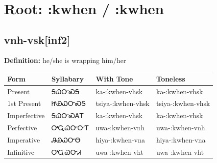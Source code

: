 \documentclass{article}%
\begin{document}
%
\normalsize%
\section*{Root: :kwhen / :kwhen}%
\subsection*{vnh-vsk[inf2]}%
\textbf{Definition: }%
he/she is wrapping him/her%
\\[0.5em]%
\begin{tabular}{|l|l|l|l|}%
\hline%
\textbf{Form}&\textbf{Syllabary}&\textbf{With Tone}&\textbf{Toneless}\\%
\hline%
Present&ᎦᏇᏅᏍᎦ&ka{-}:kwhen{-}vhsk&ka{-}:kwhen{-}vhsk\\%
1st Present&ᏥᏯᏇᏅᏍᎦ&tsiya{-}:kwhen{-}vhsk&tsiya{-}:kwhen{-}vhsk\\%
Imperfective&ᎦᏇᏅᏍᎪᎢ&ka{-}:kwhen{-}vhsk&ka{-}:kwhen{-}vhsk\\%
Perfective&ᎤᏩᏇᏅᏅᎢ&uwa{-}:kwhen{-}vnh&uwa{-}:kwhen{-}vnh\\%
Imperative&ᎯᏯᏇᏅᎾ&hiya{-}:kwhen{-}vna&hiya{-}:kwhen{-}vna\\%
Infinitive&ᎤᏩᏇᏅᏗ&uwa{-}:kwhen{-}vht&uwa{-}:kwhen{-}vht\\%
\hline%
\end{tabular}%
\\[1em]%
\end{document}
